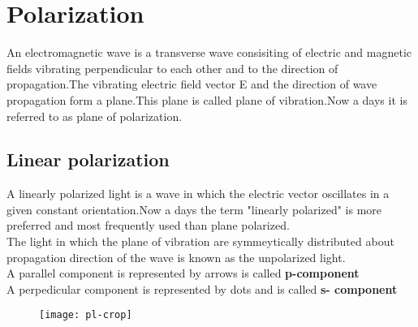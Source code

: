 \chapter{Polarization}

An electromagnetic wave is a transverse wave consisiting of electric and magnetic fields vibrating perpendicular to each other and to the direction of propagation.The vibrating electric field vector E and the direction of wave propagation form a plane.This plane is called plane of vibration.Now a days it is referred to as plane of polarization.
\section{Linear polarization}
 A linearly polarized light is a wave in which the electric vector oscillates in a given constant orientation.Now a days the term "linearly polarized" is more preferred and most frequently used than plane polarized.\\
 The light in which the plane of vibration are symmeytically distributed about propagation direction of the wave is known as the unpolarized light.\\
 A parallel component is represented by arrows is called \textbf{p-component}\\
 A perpedicular component is represented by dots and is called \textbf{s- component}\\
\begin{figure}[H]
	\centering
	\texttt{[image: pl-crop]}
	\caption{}
	\label{}
\end{figure}

